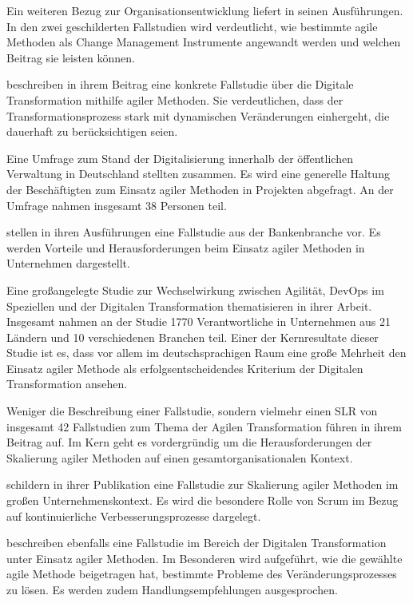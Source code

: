 Ein weiteren Bezug zur Organisationsentwicklung liefert  in seinen Ausführungen. In den zwei geschilderten Fallstudien wird verdeutlicht, wie bestimmte agile Methoden als Change Management Instrumente angewandt werden und welchen Beitrag sie leisten können.

 beschreiben in ihrem Beitrag eine konkrete Fallstudie über die Digitale Transformation mithilfe agiler Methoden. Sie verdeutlichen, dass der Transformationsprozess stark mit dynamischen Veränderungen einhergeht, die dauerhaft zu berücksichtigen seien.

Eine Umfrage zum Stand der Digitalisierung innerhalb der öffentlichen Verwaltung in Deutschland stellten  zusammen. Es wird eine generelle Haltung der Beschäftigten zum Einsatz agiler Methoden in Projekten abgefragt. An der Umfrage nahmen insgesamt 38 Personen teil.

  stellen in ihren Ausführungen eine Fallstudie aus der Bankenbranche vor. Es werden Vorteile und Herausforderungen beim Einsatz agiler Methoden in Unternehmen dargestellt.

Eine großangelegte Studie zur Wechselwirkung zwischen Agilität, DevOps im Speziellen und der Digitalen Transformation thematisieren  in ihrer Arbeit. Insgesamt nahmen an der Studie 1770 Verantwortliche in Unternehmen aus 21  Ländern und 10 verschiedenen Branchen teil. Einer der Kernresultate dieser Studie ist es, dass vor allem im deutschsprachigen Raum eine große Mehrheit den Einsatz agiler Methode als erfolgsentscheidendes Kriterium der Digitalen Transformation ansehen.

Weniger die Beschreibung einer Fallstudie, sondern vielmehr einen SLR von insgesamt 42 Fallstudien zum Thema der Agilen Transformation führen  in ihrem Beitrag auf. Im Kern geht es vordergründig um die Herausforderungen der Skalierung agiler Methoden auf einen gesamtorganisationalen Kontext.

 schildern in ihrer Publikation eine Fallstudie zur Skalierung agiler Methoden im großen Unternehmenskontext. Es wird die besondere Rolle von Scrum im Bezug auf kontinuierliche Verbesserungsprozesse dargelegt.

 beschreiben ebenfalls eine Fallstudie im Bereich der Digitalen Transformation unter Einsatz agiler Methoden. Im Besonderen wird aufgeführt, wie die gewählte agile Methode  beigetragen hat, bestimmte Probleme des Veränderungsprozesses zu lösen. Es werden zudem Handlungsempfehlungen ausgesprochen.


